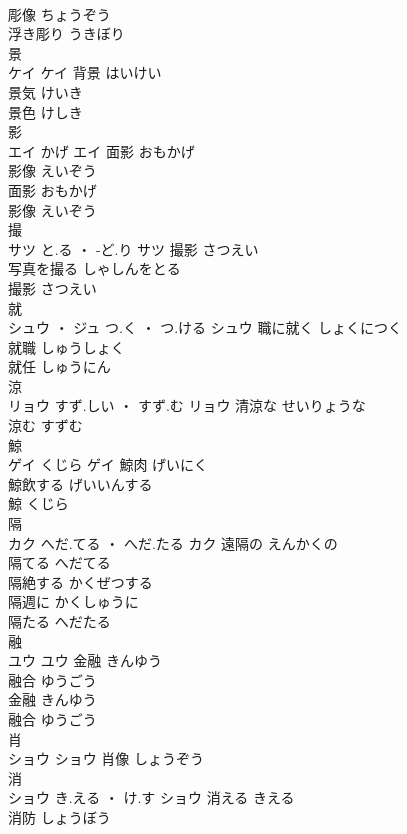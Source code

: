 \documentclass[8pt]{extreport}
\begin{document}
\begin{CJK}{UTF8}{min}
\\	彫像	ちょうぞう	
\\	浮き彫り	うきぼり	
\\	景	
\\	ケイ		ケイ	背景	はいけい	
\\	景気	けいき	
\\	景色	けしき	
\\	影	
\\	エイ	かげ	エイ	面影	おもかげ	
\\	影像	えいぞう	
\\	面影	おもかげ	
\\	影像	えいぞう	
\\	撮	
\\	サツ	と.る ・ -ど.り	サツ	撮影	さつえい	
\\	写真を撮る	しゃしんをとる	
\\	撮影	さつえい	
\\	就	
\\	シュウ ・ ジュ	つ.く ・ つ.ける	シュウ	職に就く	しょくにつく	
\\	就職	しゅうしょく	
\\	就任	しゅうにん	
\\	涼	
\\	リョウ	すず.しい ・ すず.む	リョウ	清涼な	せいりょうな	
\\	涼む	すずむ	
\\	鯨	
\\	ゲイ	くじら	ゲイ	鯨肉	げいにく	
\\	鯨飲する	げいいんする	
\\	鯨	くじら	
\\	隔	
\\	カク	へだ.てる ・ へだ.たる	カク	遠隔の	えんかくの	
\\	隔てる	へだてる	
\\	隔絶する	かくぜつする	
\\	隔週に	かくしゅうに	
\\	隔たる	へだたる	
\\	融	
\\	ユウ		ユウ	金融	きんゆう	
\\	融合	ゆうごう	
\\	金融	きんゆう	
\\	融合	ゆうごう	
\\	肖	
\\	ショウ		ショウ													肖像	しょうぞう	
\\	消	
\\	ショウ	き.える ・ け.す	ショウ	消える	きえる	
\\	消防	しょうぼう	

\end{CJK}
\end{document}
